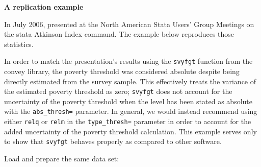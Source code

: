 \documentclass[]{book}
\begin{document}
\textbf{A replication example}

In July 2006, \citet{jenkins2006} presented at the North American Stata
Users' Group Meetings on the stata Atkinson Index command. The example
below reproduces those statistics.

In order to match the presentation's results using the \texttt{svyfgt}
function from the convey library, the poverty threshold was considered
absolute despite being directly estimated from the survey sample. This
effectively treats the variance of the estimated poverty threshold as
zero; \texttt{svyfgt} does not account for the uncertainty of the
poverty threshold when the level has been stated as absolute with the
\texttt{abs\_thresh=} parameter. In general, we would instead recommend
using either \texttt{relq} or \texttt{relm} in the
\texttt{type\_thresh=} parameter in order to account for the added
uncertainty of the poverty threshold calculation. This example serves
only to show that \texttt{svyfgt} behaves properly as compared to other
software.

Load and prepare the same data set:
\end{document}
